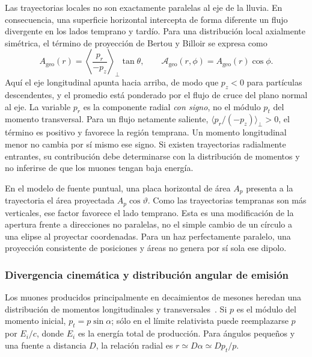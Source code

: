 Las trayectorias locales no son exactamente paralelas al eje de la lluvia. En consecuencia, una superficie horizontal intercepta de forma diferente un flujo divergente en los lados temprano y tardío. Para una distribución local axialmente simétrica, el término de proyección de Bertou y Billoir se expresa como~\cite{GAP2000_017}
\begin{equation}
A_{\mathrm{geo}}(r)=
\left\langle\frac{p_r}{-p_z}\right\rangle_{\!\perp}\tan\theta,
\qquad
\mathcal A_{\mathrm{geo}}(r,\phi)=A_{\mathrm{geo}}(r)\cos\phi.
\label{eq:efecto_geo}
\end{equation}
Aquí el eje longitudinal apunta hacia arriba, de modo que $p_z<0$ para partículas descendentes, y el promedio está ponderado por el flujo de cruce del plano normal al eje. La variable $p_r$ es la componente radial \emph{con signo}, no el módulo $p_t$ del momento transversal. Para un flujo netamente saliente, $\langle p_r/(-p_z)\rangle_\perp>0$, el término es positivo y favorece la región temprana. Un momento longitudinal menor no cambia por sí mismo ese signo. Si existen trayectorias radialmente entrantes, su contribución debe determinarse con la distribución de momentos y no inferirse de que los muones tengan baja energía.

En el modelo de fuente puntual, una placa horizontal de área $A_p$ presenta a la trayectoria el área proyectada $A_p\cos\vartheta$. Como las trayectorias tempranas son más verticales, ese factor favorece el lado temprano. Esta es una modificación de la apertura frente a direcciones no paralelas, no el simple cambio de un círculo a una elipse al proyectar coordenadas. Para un haz perfectamente paralelo, una proyección consistente de posiciones y áreas no genera por sí sola ese dipolo.

\subsubsection{Divergencia cinemática y distribución angular de emisión}
\label{subsubsec:divergencia_cinematica}

Los muones producidos principalmente en decaimientos de mesones heredan una distribución de momentos longitudinales y transversales~\cite{Cazon2012}. Si $p$ es el módulo del momento inicial, $p_t=p\sin\alpha$; sólo en el límite relativista puede reemplazarse $p$ por $E_i/c$, donde $E_i$ es la energía total de producción. Para ángulos pequeños y una fuente a distancia $D$, la relación radial es $r\simeq D\alpha\simeq Dp_t/p$.

